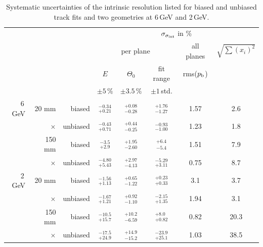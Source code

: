 \begin{table}[tbp]
 \begin{center}
  \begin{tabular}{r|r|r|c|c|c|c||c}
  \multicolumn{3}{c|}{} & \multicolumn{5}{c}{$\sigma_{\sigma_{\textrm{int}}}$ in \%}\\
  \multicolumn{3}{c|}{} & \multicolumn{3}{c|}{per plane} & all planes& $\sqrt{\sum (x_i)^2}$\\
  \multicolumn{3}{c|}{} &$E$         & $\Theta_0$      & fit range    & rms($p_{\textrm{b}}$) &  \\ 
  \multicolumn{3}{c|}{} & $\pm5\,\%$ &  $\pm 3.5\,\%$  & $\pm 1\,$std.&               &  \\ \hline
  6\,GeV & 20 mm   &  biased  &  ${}^{-0.34}_{+0.21}$ & ${}^{+0.08}_{-0.28}$ & ${}^{+1.76}_{-1.27}$ & 1.57 &  2.6  \\
         & ×       & unbiased &  ${}^{-0.43}_{+0.71}$ & ${}^{+0.44}_{-0.25}$ & ${}^{-0.93}_{-1.00}$ & 1.23 &  1.8  \\
	 & 150 mm  &  biased  &  ${}^{-3.5}_{+2.9}$   & ${}^{+1.95}_{-2.60}$ & ${}^{+6.4}_{-5.4}$   & 1.51 &  7.9  \\
	 & ×       & unbiased &  ${}^{-4.80}_{+5.43}$ & ${}^{+2.97}_{-4.13}$ & ${}^{-5.29}_{+3.11}$ & 0.75 &  8.7  \\ \hline
  2\,GeV & 20 mm   &  biased  &  ${}^{-1.56}_{+1.13}$ & ${}^{+0.65}_{-1.22}$ & ${}^{+0.23}_{+0.33}$ &  3.1 &  3.7  \\
         & ×       & unbiased &  ${}^{-1.67}_{+1.21}$ & ${}^{+0.92}_{-1.10}$ & ${}^{-2.15}_{+1.35}$ & 1.94 &  3.1  \\
	 & 150 mm  &  biased  &  ${}^{-10.5}_{+15.7}$ & ${}^{+10.2}_{-6.59}$ & ${}^{+8.0}_{+0.82}$  & 0.82 &  20.3 \\
	 & ×       & unbiased &  ${}^{-17.5}_{+24.9}$ & ${}^{+14.9}_{-15.2}$ & ${}^{-23.9}_{+25.1}$ & 1.03 &  38.5  \\ 
  \end{tabular}
    \caption[Systematic uncertainties]{Systematic uncertainties of the intrinsic resolution listed for biased and unbiased track fits and two geometries at 6\,GeV and 2\,GeV.}
  \label{tab:uncerts}
 \end{center}
\end{table}

